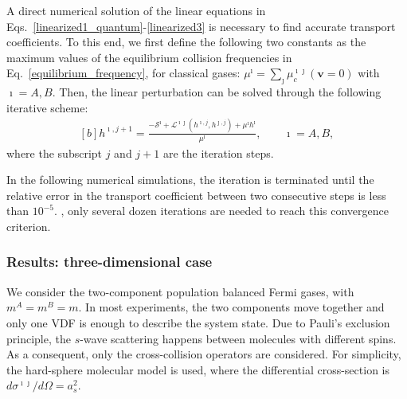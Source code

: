 A direct numerical solution of the linear equations in Eqs.~\eqref{linearized1_quantum}-\eqref{linearized3} is necessary to find accurate transport coefficients. To this end, we first define the following two constants as the maximum values of the equilibrium collision frequencies in Eq.~\eqref{equilibrium_frequency}, for classical gases:
$
\mu^\imath=\sum_{\jmath}\mu_c^{\imath\jmath}(\textbf{v}=0)$ with $\imath=A, B$. 
Then, the linear perturbation can be solved through the following iterative scheme:
\begin{equation}\label{iteration_transport}
\begin{aligned}[b]
h^{\imath,j+1}=\frac{-\mathcal{S}^\imath+\mathcal{L}^{\imath\jmath}(h^{\imath,j},h^{\jmath,j})+\mu^\imath{h}^\imath}{\mu^{\imath}}, \quad\quad \imath=A, B,
\end{aligned}
\end{equation}
where the subscript $j$ and $j+1$ are the iteration steps. 





In the following numerical simulations, the iteration is terminated until the relative error in the transport coefficient between two consecutive steps is less than $10^{-5}$. , only several dozen iterations are needed to reach this convergence criterion.


\subsubsection{Results: three-dimensional case}\label{D3case}


We consider the two-component population balanced Fermi gases, with $m^A=m^B=m$. In  most experiments, the two components move together and only one VDF is enough to describe the system state. Due to Pauli's exclusion principle, the $s$-wave scattering happens between molecules with different spins. As a consequent, only the cross-collision operators are considered. For simplicity, the hard-sphere molecular model is used, where the differential cross-section is
${d\sigma^{\imath\jmath}}/{d\Omega}=a_s^2$.



